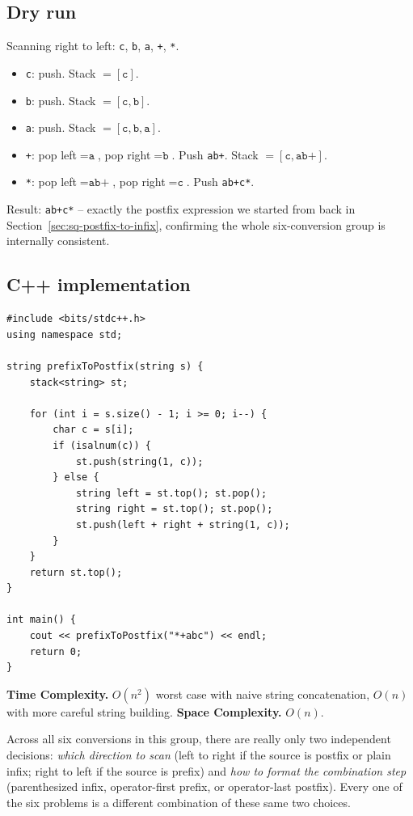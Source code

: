 \subsection*{Dry run}


Scanning right to left: \texttt{c}, \texttt{b}, \texttt{a}, \texttt{+},
\texttt{*}.

\begin{itemize}
  \item \texttt{c}: push. Stack $=[\texttt{c}]$.
  \item \texttt{b}: push. Stack $=[\texttt{c},\texttt{b}]$.
  \item \texttt{a}: push. Stack $=[\texttt{c},\texttt{b},\texttt{a}]$.
  \item \texttt{+}: pop left$=\texttt{a}$, pop right$=\texttt{b}$. Push
        \texttt{ab+}. Stack $=[\texttt{c},\texttt{ab+}]$.
  \item \texttt{*}: pop left$=\texttt{ab+}$, pop right$=\texttt{c}$.
        Push \texttt{ab+c*}.
\end{itemize}

Result: \texttt{ab+c*} -- exactly the postfix expression we started from
back in Section~\ref{sec:sq-postfix-to-infix}, confirming the whole
six-conversion group is internally consistent.

\subsection*{C++ implementation}

\begin{lstlisting}
#include <bits/stdc++.h>
using namespace std;

string prefixToPostfix(string s) {
    stack<string> st;

    for (int i = s.size() - 1; i >= 0; i--) {
        char c = s[i];
        if (isalnum(c)) {
            st.push(string(1, c));
        } else {
            string left = st.top(); st.pop();
            string right = st.top(); st.pop();
            st.push(left + right + string(1, c));
        }
    }
    return st.top();
}

int main() {
    cout << prefixToPostfix("*+abc") << endl;
    return 0;
}
\end{lstlisting}

\begin{complexitybox}
\textbf{Time Complexity.} $O(n^2)$ worst case with naive string
concatenation, $O(n)$ with more careful string building.
\textbf{Space Complexity.} $O(n)$.
\end{complexitybox}

\begin{takeawaybox}
Across all six conversions in this group, there are really only two
independent decisions: \emph{which direction to scan} (left to right if
the source is postfix or plain infix; right to left if the source is
prefix) and \emph{how to format the combination step} (parenthesized
infix, operator-first prefix, or operator-last postfix). Every one of the
six problems is a different combination of these same two choices.
\end{takeawaybox}
